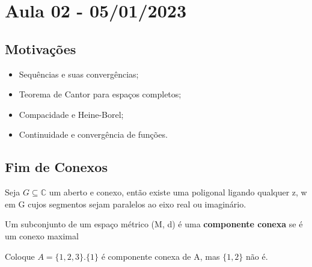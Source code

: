 \documentclass[ComplexAnalysis/complex.tex]{subfiles}
\begin{document}
\section{Aula 02 - 05/01/2023}
\subsection{Motivações}
\begin{itemize}
	\item Sequências e suas convergências;
	\item Teorema de Cantor para espaços completos;
	\item Compacidade e Heine-Borel;
	\item Continuidade e convergência de funções.
\end{itemize}

\subsection{Fim de Conexos}
\begin{theorem*}
	Seja $G\subseteq{\mathbb{C}}$ um aberto e conexo, então existe uma poligonal ligando qualquer z, w em G cujos segmentos
	sejam paralelos ao eixo real ou imaginário.
\end{theorem*}

\begin{def*}
	Um subconjunto de um espaço métrico (M, d) é uma \textbf{componente conexa} se é um conexo maximal
\end{def*}

\begin{example}
	Coloque $A = \{1, 2, 3\}. \{1\}$ é componente conexa de A, mas $\{1, 2\}$ não é.
\end{example}
\end{document}
